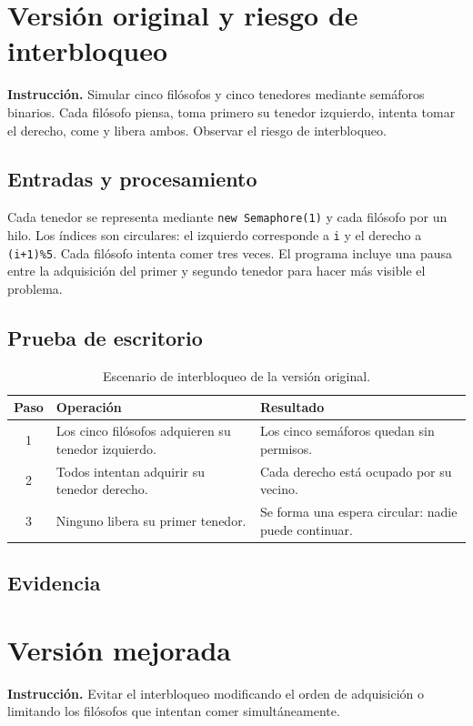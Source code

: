 \documentclass[12pt]{report}
\begin{document}
\tableofcontents
\listoffigures

\chapter{Versión original y riesgo de interbloqueo}
\textbf{Instrucción.} Simular cinco filósofos y cinco tenedores mediante semáforos binarios. Cada filósofo piensa, toma primero su tenedor izquierdo, intenta tomar el derecho, come y libera ambos. Observar el riesgo de interbloqueo.

\section{Entradas y procesamiento}
Cada tenedor se representa mediante \texttt{new Semaphore(1)} y cada filósofo por un hilo. Los índices son circulares: el izquierdo corresponde a \texttt{i} y el derecho a \texttt{(i+1)\%5}. Cada filósofo intenta comer tres veces. El programa incluye una pausa entre la adquisición del primer y segundo tenedor para hacer más visible el problema.

\section{Prueba de escritorio}
\begin{table}[H]\centering
\caption{Escenario de interbloqueo de la versión original.}
\begin{tabularx}{\textwidth}{c X X}\toprule
Paso & Operación & Resultado\\\midrule
1 & Los cinco filósofos adquieren su tenedor izquierdo. & Los cinco semáforos quedan sin permisos.\\
2 & Todos intentan adquirir su tenedor derecho. & Cada derecho está ocupado por su vecino.\\
3 & Ninguno libera su primer tenedor. & Se forma una espera circular: nadie puede continuar.\\\bottomrule
\end{tabularx}\end{table}

\section{Evidencia}

\chapter{Versión mejorada}
\textbf{Instrucción.} Evitar el interbloqueo modificando el orden de adquisición o limitando los filósofos que intentan comer simultáneamente.
\end{document}
